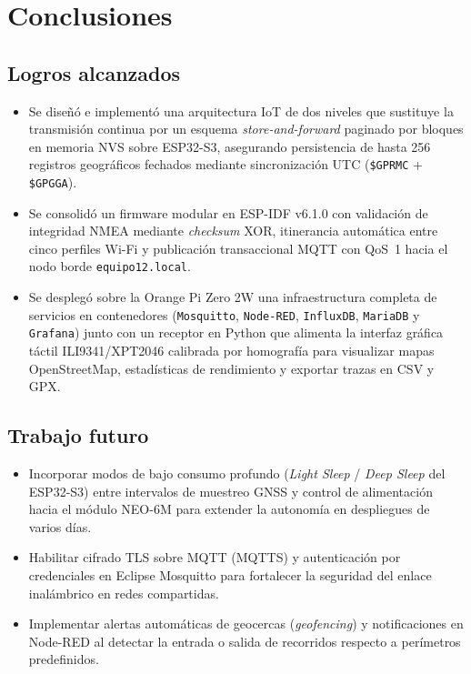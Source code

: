 \documentclass[12pt, letterpaper]{article}
\begin{document}
\vspace*{0.8cm}
\section*{\centering \fontsize{16}{17}\sffamily\selectfont Conclusiones}

\subsection*{Logros alcanzados}
\begin{itemize}
    \item Se diseñó e implementó una arquitectura IoT de dos niveles que sustituye la transmisión continua por un esquema \textit{store-and-forward} paginado por bloques en memoria NVS sobre ESP32-S3, asegurando persistencia de hasta 256 registros geográficos fechados mediante sincronización UTC (\texttt{\$GPRMC} + \texttt{\$GPGGA}).
    \item Se consolidó un firmware modular en ESP-IDF v6.1.0 con validación de integridad NMEA mediante \textit{checksum} XOR, itinerancia automática entre cinco perfiles Wi-Fi y publicación transaccional MQTT con QoS~1 hacia el nodo borde \texttt{equipo12.local}.
    \item Se desplegó sobre la Orange Pi Zero 2W una infraestructura completa de servicios en contenedores (\texttt{Mosquitto}, \texttt{Node-RED}, \texttt{InfluxDB}, \texttt{MariaDB} y \texttt{Grafana}) junto con un receptor en Python que alimenta la interfaz gráfica táctil ILI9341/XPT2046 calibrada por homografía para visualizar mapas OpenStreetMap, estadísticas de rendimiento y exportar trazas en CSV y GPX.
\end{itemize}

\subsection*{Trabajo futuro}
\begin{itemize}
    \item Incorporar modos de bajo consumo profundo (\textit{Light Sleep} / \textit{Deep Sleep} del ESP32-S3) entre intervalos de muestreo GNSS y control de alimentación hacia el módulo NEO-6M para extender la autonomía en despliegues de varios días.
    \item Habilitar cifrado TLS sobre MQTT (MQTTS) y autenticación por credenciales en Eclipse Mosquitto para fortalecer la seguridad del enlace inalámbrico en redes compartidas.
    \item Implementar alertas automáticas de geocercas (\textit{geofencing}) y notificaciones en Node-RED al detectar la entrada o salida de recorridos respecto a perímetros predefinidos.
\end{itemize}
\end{document}
